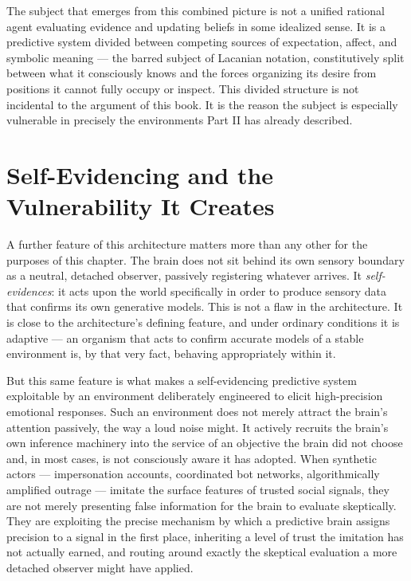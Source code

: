 \documentclass[12pt,a4paper]{book}
\begin{document}
The subject that emerges from this combined picture is not a unified rational agent evaluating evidence and updating beliefs in some idealized sense. It is a predictive system divided between competing sources of expectation, affect, and symbolic meaning — the barred subject of Lacanian notation, constitutively split between what it consciously knows and the forces organizing its desire from positions it cannot fully occupy or inspect. This divided structure is not incidental to the argument of this book. It is the reason the subject is especially vulnerable in precisely the environments Part II has already described.

\section{Self-Evidencing and the Vulnerability It Creates}

A further feature of this architecture matters more than any other for the purposes of this chapter. The brain does not sit behind its own sensory boundary as a neutral, detached observer, passively registering whatever arrives. It \emph{self-evidences}: it acts upon the world specifically in order to produce sensory data that confirms its own generative models. This is not a flaw in the architecture. It is close to the architecture's defining feature, and under ordinary conditions it is adaptive — an organism that acts to confirm accurate models of a stable environment is, by that very fact, behaving appropriately within it.

But this same feature is what makes a self-evidencing predictive system exploitable by an environment deliberately engineered to elicit high-precision emotional responses. Such an environment does not merely attract the brain's attention passively, the way a loud noise might. It actively recruits the brain's own inference machinery into the service of an objective the brain did not choose and, in most cases, is not consciously aware it has adopted. When synthetic actors — impersonation accounts, coordinated bot networks, algorithmically amplified outrage — imitate the surface features of trusted social signals, they are not merely presenting false information for the brain to evaluate skeptically. They are exploiting the precise mechanism by which a predictive brain assigns precision to a signal in the first place, inheriting a level of trust the imitation has not actually earned, and routing around exactly the skeptical evaluation a more detached observer might have applied.
\end{document}

